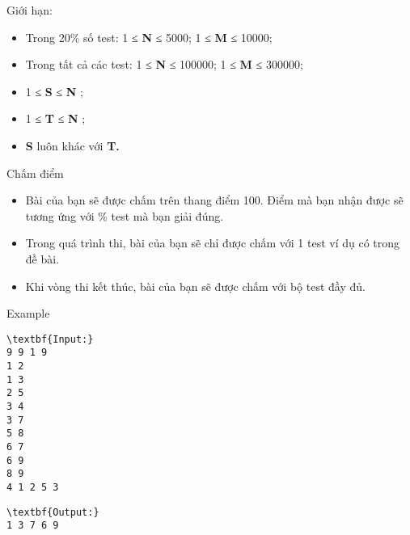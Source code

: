 Giới hạn:
\begin{itemize}
	\item Trong 20\% số test: 1 ≤ \textbf{ N } ≤ 5000; 1 ≤ \textbf{ M } ≤ 10000;
	\item Trong tất cả các test: 1 ≤ \textbf{ N } ≤ 100000; 1 ≤ \textbf{ M } ≤ 300000;
	\item 1 ≤ \textbf{ S } ≤ \textbf{ N } ;
	\item 1 ≤ \textbf{ T } ≤ \textbf{ N } ;
	\item \textbf{S } luôn khác với \textbf{ T. }
\end{itemize}
Chấm điểm
\begin{itemize}
	\item Bài của bạn sẽ được chấm trên thang điểm 100. Điểm mà bạn nhận được sẽ tương ứng với \% test mà bạn giải đúng.
	\item Trong quá trình thi, bài của bạn sẽ chỉ được chấm với 1 test ví dụ có trong đề bài.
	\item Khi vòng thi kết thúc, bài của bạn sẽ được chấm với bộ test đầy đủ.
\end{itemize}
\begin{itemize}
\end{itemize}
Example
\begin{verbatim}
\textbf{Input:}
9 9 1 9
1 2
1 3
2 5
3 4
3 7
5 8
6 7
6 9
8 9
4 1 2 5 3\end{verbatim}
\begin{verbatim}
\textbf{Output:}
1 3 7 6 9\end{verbatim}